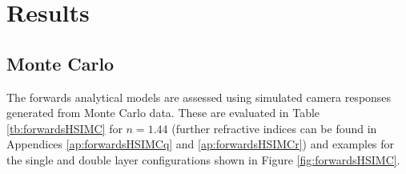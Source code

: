 \section{Results}

\subsection{Monte Carlo}\label{sec:MCHSI}
The forwards analytical models are assessed using simulated camera responses generated from Monte Carlo data. 
These are evaluated in Table \ref{tb:forwardsHSIMC} for $n=1.44$ (further refractive indices can be found in Appendices \ref{ap:forwardsHSIMCq} and \ref{ap:forwardsHSIMCr}) and examples for the single and double layer configurations shown in Figure \ref{fig:forwardsHSIMC}. 
